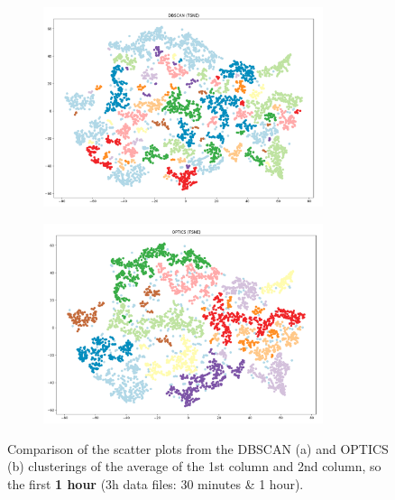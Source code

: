 \begin{figure}[H]
	\centering
	\begin{subfigure}{.5\textwidth}
    \centering
    \includegraphics[width=0.9\textwidth]{./images/clusteringResults/3h-2-DBSCAN.png}
  \end{subfigure}%
  \begin{subfigure}{.5\textwidth}
    \centering
    \includegraphics[width=0.9\textwidth]{./images/clusteringResults/3h-2-OPTICS.png}
	\end{subfigure}
	\caption{Comparison of the scatter plots from the DBSCAN (a) and OPTICS (b) clusterings of the average of the 1st column and 2nd column, so the first \textbf{1 hour} (3h data files: 30 minutes \& 1 hour).}
  \label{figure:finalClustering3h-2}
\end{figure}

